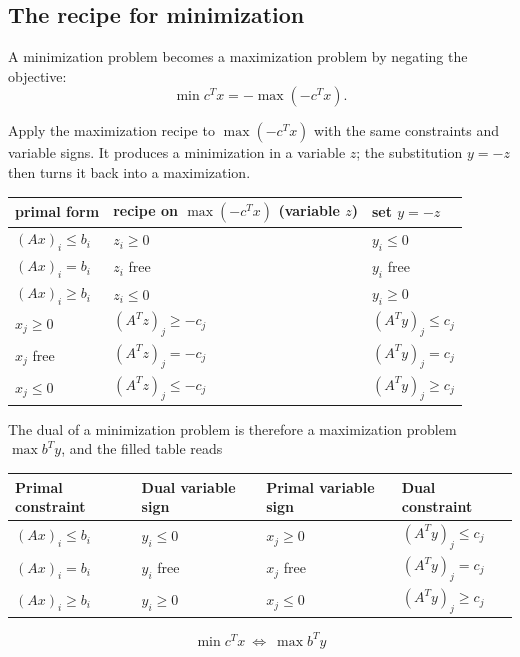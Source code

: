 \documentclass[a4paper,11pt]{article}
\newif\ifexplain
\newcommand{\teil}[1]{\subsection*{#1}}
\newcommand{\explain}[1]{\ifexplain\begin{erklbox}#1\end{erklbox}\fi}
\begin{document}
\teil{The recipe for minimization}
A minimization problem becomes a maximization problem by negating the objective:
\[
\min c^Tx = -\max(-c^Tx).
\]
\explain{Minimieren und Maximieren hängen über das Vorzeichen zusammen: Den kleinsten Wert von $f$ zu finden ist dasselbe, wie den größten Wert von $-f$ zu finden und davon das Vorzeichen zu nehmen. Deshalb kann man das Rezept für Maximierungsprobleme wiederverwenden.}
Apply the maximization recipe to $\max(-c^Tx)$ with the same constraints and variable signs. It produces a minimization in a variable $z$; the substitution $y=-z$ then turns it back into a maximization.
\explain{Warum die Substitution $y=-z$? Das Rezept für $\max(-c^Tx)$ liefert ein Minimierungsproblem in $z$. Das duale Problem eines Minimierungsproblems soll aber ein Maximierungsproblem sein. Mit $y=-z$ dreht man das Vorzeichen der Zielfunktion um, aus $\min b^Tz$ wird $\max b^Ty$.}
\begin{center}
\begin{tabular}{@{}lll@{}}
\toprule
primal form & recipe on $\max(-c^Tx)$ (variable $z$) & set $y=-z$\\
\midrule
$(Ax)_i\le b_i$ & $z_i\ge0$ & $y_i\le0$\\
$(Ax)_i=b_i$ & $z_i$ free & $y_i$ free\\
$(Ax)_i\ge b_i$ & $z_i\le0$ & $y_i\ge0$\\
$x_j\ge0$ & $(A^Tz)_j\ge -c_j$ & $(A^Ty)_j\le c_j$\\
$x_j$ free & $(A^Tz)_j=-c_j$ & $(A^Ty)_j=c_j$\\
$x_j\le0$ & $(A^Tz)_j\le -c_j$ & $(A^Ty)_j\ge c_j$\\
\bottomrule
\end{tabular}
\end{center}
\explain{In der mittleren Spalte steht wörtlich das Rezept für Maximierungsprobleme, nur mit $-c$ statt $c$ als Zielfunktionsvektor. Die rechte Spalte entsteht daraus mit $y=-z$: Jede Ungleichung mit $-c$ wird mit $-1$ durchmultipliziert, dadurch drehen sich die Relationszeichen um.}
The dual of a minimization problem is therefore a maximization problem $\max b^Ty$, and the filled table reads
\begin{center}
\begin{tabular}{@{}llll@{}}
\toprule
Primal constraint & Dual variable sign & Primal variable sign & Dual constraint\\
\midrule
$(Ax)_i\le b_i$ & $y_i\le0$ & $x_j\ge0$ & $(A^Ty)_j\le c_j$\\
$(Ax)_i=b_i$ & $y_i$ free & $x_j$ free & $(A^Ty)_j=c_j$\\
$(Ax)_i\ge b_i$ & $y_i\ge0$ & $x_j\le0$ & $(A^Ty)_j\ge c_j$\\
\bottomrule
\end{tabular}
\end{center}
\explain{Kurz gemerkt: Gegenüber dem Maximierungsrezept drehen sich in der Dualisierung eines Minimierungsproblems alle Ungleichheitszeichen um. Eine $\ge$-Nebenbedingung wird zur nichtnegativen dualen Variable, eine nichtnegative Variable zur $\le$-Dualnebenbedingung.}
\[
\boxed{\min c^Tx \ \Longleftrightarrow\ \max b^Ty}
\]
\end{document}
